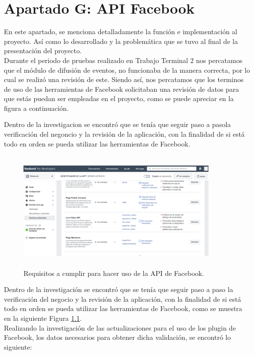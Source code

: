 	\chapter{Apartado G: API Facebook}
	\label{apiFB}
	\noindent En este apartado, se menciona detalladamente la función e implementación al proyecto. Así como lo desarrollado y la problemática que se tuvo al final de la presentación del proyecto.\\
		
	Durante el periodo de pruebas realizado en Trabajo Terminal 2 nos percatamos que el módulo de difusión de eventos, no funcionaba de la manera correcta, por lo cual se realizó una revisión de este. Siendo así, nos percatamos que los terminos de uso de las herramientas de Facebook solicitaban una revisión de datos para que estás puedan ser empleadas en el proyecto, como se puede apreciar en la figura a continuación.
	
	Dentro de la investigacion se encontró que se  tenía que seguir paso a pasola verificación del negoncio y la revisión de la aplicación, con la finalidad de si está todo en orden se pueda utilizar las herramientas de Facebook.
	
	\begin{figure}[hbt!]
		\centering
		\includegraphics[width=10cm, height=6cm]{Imagenes/FacebookAPI/RequisitoPagina}
		\caption{Requisitos a cumplir para hacer uso de la API de Facebook.}
		\label{requisitosfb}
	\end{figure}
	
	\noindent Dentro de la investigación se encontró que se tenía que seguir paso a paso la
	verificación del negocio y la revisión de la aplicación, con la finalidad de si está todo en orden se
	pueda utilizar las herramientas de Facebook, como se muestra en la siguiente Figura \ref{requisitosfb}. \\
	
	\noindent Realizando la investigación de las actualizaciones para el uso de los plugin de Facebook,
	los datos necesarios para obtener dicha validación, se encontró lo siguiente: \\
	\pagebreak
	
